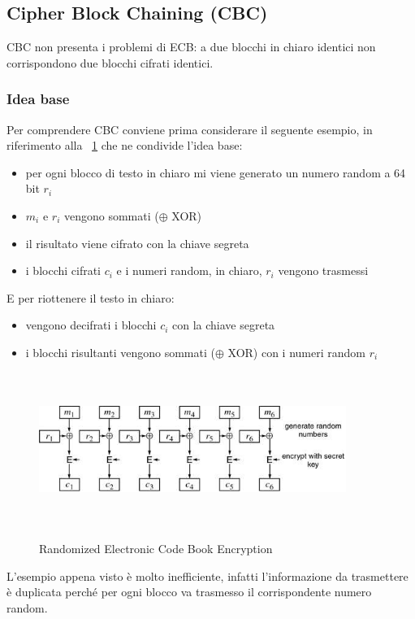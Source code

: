 \subsection{Cipher Block Chaining (CBC)}
CBC non presenta i problemi di ECB: a due blocchi in chiaro identici non corrispondono
due blocchi cifrati identici.
\subsubsection{Idea base}
Per comprendere CBC conviene prima considerare il seguente esempio, in riferimento alla \figurename ~\ref{fig:rand_ele_cb_enc} che ne condivide l’idea base:
\begin{itemize}
\item per ogni blocco di testo in chiaro mi viene generato un numero random a 64 bit $r_{i}$
\item $m_{i}$ e $r_{i}$ vengono sommati ($\oplus$ XOR)
\item il risultato viene cifrato con la chiave segreta
\item i blocchi cifrati $c_{i}$ e i numeri random, in chiaro, $r_{i}$ vengono trasmessi
\end{itemize}
E per riottenere il testo in chiaro:
\begin{itemize}
\item vengono decifrati i blocchi $c_{i}$ con la chiave segreta 
\item i blocchi risultanti vengono sommati ($\oplus$ XOR) con i numeri random $r_{i}$
\end{itemize}
\begin{figure}
\centering%
	\subfigure%
	{\includegraphics[height=5cm, width=10cm, keepaspectratio]{Immagini/Capitolo3/rand_ele_cb_enc.png}}
	\caption{Randomized Electronic Code Book Encryption\label{fig:rand_ele_cb_enc}} 	
\end{figure}
L'esempio appena visto è molto inefficiente, infatti l'informazione da trasmettere è duplicata perché per ogni blocco va trasmesso il corrispondente numero random. \newline
